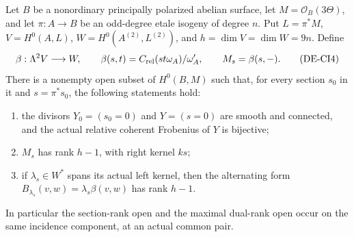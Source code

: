 \begin{proposition}
\label{prop:DE-common-Cartier-incidence}
Let \(B\) be a nonordinary principally polarized abelian surface,
let \(M=\mathcal O_B(3\Theta)\), and let
\(\pi:A\to B\) be an odd-degree etale isogeny of degree \(n\).
Put \(L=\pi^*M\), \(V=H^0(A,L)\), \(W=H^0(A^{(2)},L^{(2)})\),
and \(h=\dim V=\dim W=9n\).  Define
\[
 \beta:\Lambda^2V\longrightarrow W,\qquad
 \beta(s,t)=C_{\rm rel}(st\omega_A)/\omega_A',
 \qquad M_s=\beta(s,-).
                                                        \tag{DE-CI4}
\]
There is a nonempty open subset of \(H^0(B,M)\) such that,
for every section \(s_0\) in it and \(s=\pi^*s_0\),
the following statements hold:
\begin{enumerate}
\item the divisors \(Y_0=(s_0=0)\) and \(Y=(s=0)\) are smooth
and connected, and the actual relative coherent Frobenius of \(Y\)
is bijective;
\item \(M_s\) has rank \(h-1\), with right kernel \(ks\);
\item if \(\lambda_s\in W^*\) spans its actual left kernel,
then the alternating form
\(B_{\lambda_s}(v,w)=\lambda_s\beta(v,w)\) has rank \(h-1\).
\end{enumerate}
In particular the section-rank open and the maximal dual-rank
open occur on the same incidence component, at an actual common pair.
\end{proposition}
